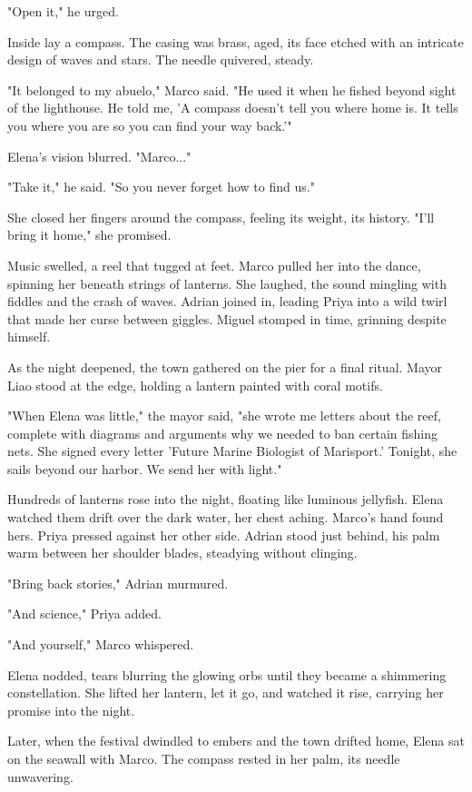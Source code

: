 "Open it," he urged.

Inside lay a compass. The casing was brass, aged, its face etched with an intricate design of waves and stars. The needle quivered, steady.

"It belonged to my abuelo," Marco said. "He used it when he fished beyond sight of the lighthouse. He told me, 'A compass doesn't tell you where home is. It tells you where you are so you can find your way back.'"

Elena's vision blurred. "Marco..."

"Take it," he said. "So you never forget how to find us."

She closed her fingers around the compass, feeling its weight, its history. "I'll bring it home," she promised.

Music swelled, a reel that tugged at feet. Marco pulled her into the dance, spinning her beneath strings of lanterns. She laughed, the sound mingling with fiddles and the crash of waves. Adrian joined in, leading Priya into a wild twirl that made her curse between giggles. Miguel stomped in time, grinning despite himself.

As the night deepened, the town gathered on the pier for a final ritual. Mayor Liao stood at the edge, holding a lantern painted with coral motifs.

"When Elena was little," the mayor said, "she wrote me letters about the reef, complete with diagrams and arguments why we needed to ban certain fishing nets. She signed every letter 'Future Marine Biologist of Marisport.' Tonight, she sails beyond our harbor. We send her with light."

Hundreds of lanterns rose into the night, floating like luminous jellyfish. Elena watched them drift over the dark water, her chest aching. Marco's hand found hers. Priya pressed against her other side. Adrian stood just behind, his palm warm between her shoulder blades, steadying without clinging.

"Bring back stories," Adrian murmured.

"And science," Priya added.

"And yourself," Marco whispered.

Elena nodded, tears blurring the glowing orbs until they became a shimmering constellation. She lifted her lantern, let it go, and watched it rise, carrying her promise into the night.

\bigskip

Later, when the festival dwindled to embers and the town drifted home, Elena sat on the seawall with Marco. The compass rested in her palm, its needle unwavering.

